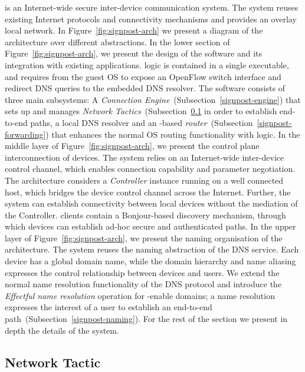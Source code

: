 \signpost is an Internet-wide secure inter-device communication system. The
system reuses existing Internet protocols and connectivity mechanisms and provides
an overlay local network. In Figure~\ref{fig:signpost-arch} we present 
a diagram of the \signpost architecture over different abstractions. 
In the lower section of Figure~\ref{fig:signpost-arch}, we present the design of
the \signpost software and its integration with existing applications.
\signpost logic is contained in a single executable, and requires from the guest
OS to expose an OpenFlow switch interface and redirect DNS queries to the
embedded DNS resolver.  The software consists of three main subsystems: A
{\it Connection Engine}~(Subsection~\ref{signpost-engine}) that sets up and
manages {\it Network Tactics}~(Subsection~\ref{signpost-tactic} in order to establish
end-to-end paths, a local DNS resolver and an \of-based {\it \signpost
  router}~(Subsection~\ref{signpost-forwarding}) that enhances the normal OS
routing functionality with \signpost logic.  
In the middle layer of Figure~\ref{fig:signpost-arch}, we present the control
plane interconnection of \signpost devices. The system relies on an
Internet-wide inter-device control channel, which enables
connection capability and parameter negotiation. The architecture considers a
\emph{Controller \signpost} instance running on a well connected host, which bridges
the device control channel across the Internet.  Further, the system can
establish connectivity between local devices without the mediation of the
\signpost Controller.  \signpost clients contain a Bonjour-based discovery
mechanism, through which devices can establish ad-hoc secure and authenticated
paths.
In the upper layer of Figure~\ref{fig:signpost-arch}, we present the naming
organisation of the \signpost architecture. The system reuses the naming
abstraction of the DNS service. Each device has a global domain name, while the
domain hierarchy and name aliasing expresses the control relationship between
devices and users.  We extend the normal name resolution functionality of the
DNS protocol and introduce the  {\it Effectful name resolution} operation for
\signpost-enable domains; a name resolution expresses the interest of a user to
establish an end-to-end path~(Subsection~\ref{signpost-naming}). For the rest of
the section we present in depth the details of the \signpost system. 

\subsection{Network Tactic} \label{signpost-tactic}

